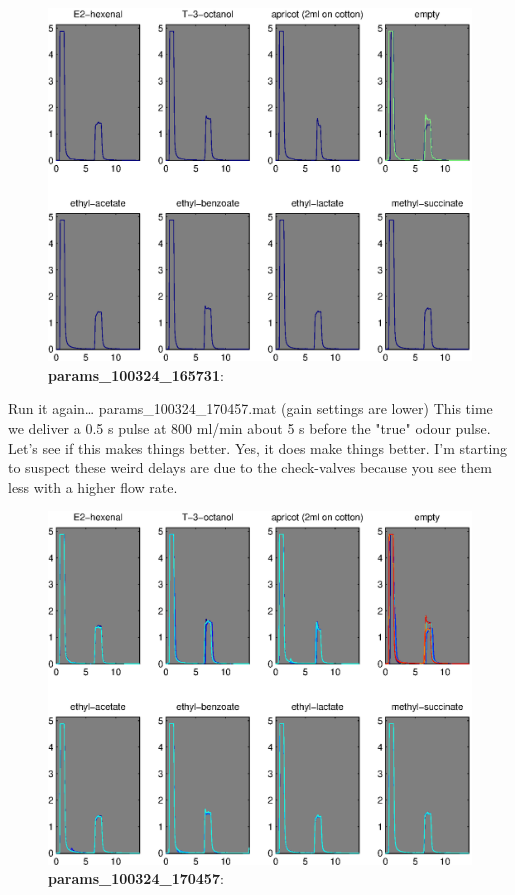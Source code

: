 \documentclass[a4paper]{report}
\begin{document}
\begin{figure}
\centering
\includegraphics[width=5in]{params_100324_165731.eps}
\caption{\textbf{params\_100324\_165731}:}
\end{figure}

\clearpage
Run it again\ldots
params\_100324\_170457.mat (gain settings are lower)
This time we deliver a 0.5 s pulse at 800 ml/min about 5 s before the
"true" odour pulse. Let's see if this makes things better. Yes, it
does make things better. I'm starting to suspect these weird delays
are due to the check-valves because you see them less with a higher
flow rate. 


\begin{figure}[h]
\centering
\includegraphics[width=5in]{params_100324_170457.eps}
\caption{\textbf{params\_100324\_170457}:}
\end{figure}
\end{document}

